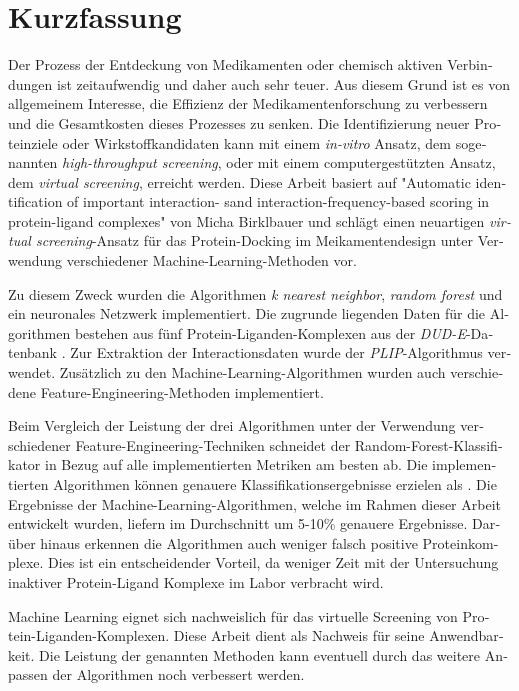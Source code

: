 \chapter{Kurzfassung}

\begin{german}
Der Prozess der Entdeckung von Medikamenten oder chemisch aktiven Verbindungen ist zeitaufwendig
und daher auch sehr teuer. Aus diesem Grund ist es von allgemeinem Interesse, die Effizienz der
Medikamentenforschung zu verbessern und die Gesamtkosten dieses Prozesses zu senken. Die Identifizierung
neuer Proteinziele oder Wirkstoffkandidaten kann mit einem \textit{in-vitro} Ansatz, dem sogenannten \textit{high-throughput screening},
oder mit einem computergestützten Ansatz, dem \textit{virtual screening}, erreicht werden. Diese Arbeit basiert auf
"Automatic identification of important interaction-
sand interaction-frequency-based scoring in protein-ligand complexes"
von Micha Birklbauer \cite[]{Birklbauer2021} und schlägt einen neuartigen \textit{virtual screening}-Ansatz
für das Protein-Docking im Meikamentendesign unter Verwendung verschiedener Machine-Learning-Methoden vor.

Zu diesem Zweck wurden die Algorithmen \textit{k nearest neighbor}, \textit{random forest} und ein neuronales Netzwerk implementiert.
Die zugrunde liegenden Daten für die Algorithmen bestehen aus fünf Protein-Liganden-Komplexen aus
der \textit{DUD-E}-Datenbank \cite[]{Mysinger2012}. Zur Extraktion der Interactionsdaten wurde der \textit{PLIP}-Algorithmus \cite[]{Salentin2015} verwendet.
Zusätzlich zu den Machine-Learning-Algorithmen wurden auch verschiedene Feature-Engineering-Methoden implementiert.

Beim Vergleich der Leistung der drei Algorithmen unter der Verwendung verschiedener Feature-Engineering-Techniken
schneidet der Random-Forest-Klassifikator in Bezug auf alle implementierten Metriken am besten ab.
Die implementierten Algorithmen können genauere Klassifikationsergebnisse erzielen als \cite[text]{Birklbauer2021}.
Die Ergebnisse der Machine-Learning-Algorithmen, welche im Rahmen dieser Arbeit entwickelt wurden, liefern im Durchschnitt
um 5-10\% genauere Ergebnisse. Darüber hinaus erkennen die Algorithmen auch weniger falsch positive Proteinkomplexe.
Dies ist ein entscheidender Vorteil, da weniger Zeit mit der Untersuchung inaktiver Protein-Ligand Komplexe
im Labor verbracht wird.

Machine Learning eignet sich nachweislich für das virtuelle Screening von Protein-Liganden-Komplexen.
Diese Arbeit dient als Nachweis für seine Anwendbarkeit. Die Leistung der genannten Methoden
kann eventuell durch das weitere Anpassen der Algorithmen noch verbessert werden.
\end{german}
